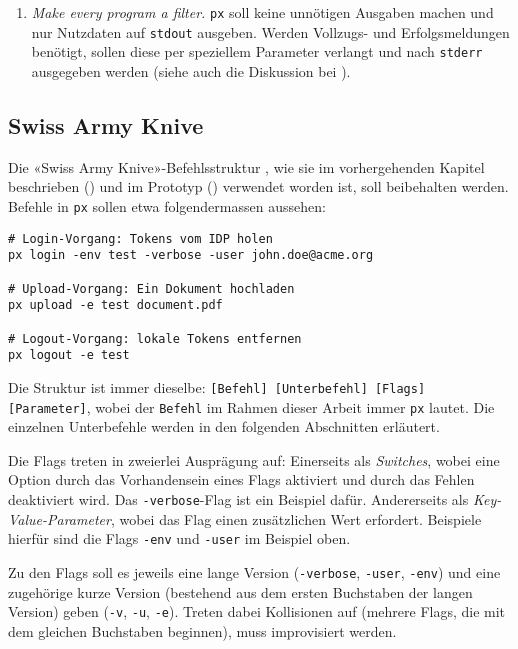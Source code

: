 \begin{enumerate}
    \item \textit{Make every program a filter.} \texttt{px} soll keine unnötigen Ausgaben machen und nur Nutzdaten auf \texttt{stdout} ausgeben. Werden Vollzugs- und Erfolgsmeldungen benötigt, sollen diese per speziellem Parameter verlangt und nach \texttt{stderr} ausgegeben werden (siehe auch die Diskussion bei ).
\end{enumerate}

\subsection{Swiss Army Knive}
\label{sec:Swiss-Army-Knive}

Die «Swiss Army Knive»-Befehlsstruktur \cite[S. 290]{gopl}, wie sie im vorhergehenden Kapitel beschrieben () und im Prototyp () verwendet worden ist, soll beibehalten werden. Befehle in \texttt{px} sollen etwa folgendermassen aussehen:

\begin{lstlisting}[caption={Beispielhafter Befehl mit Command, Subcommand, Flags, Parametern}]
# Login-Vorgang: Tokens vom IDP holen
px login -env test -verbose -user john.doe@acme.org

# Upload-Vorgang: Ein Dokument hochladen
px upload -e test document.pdf

# Logout-Vorgang: lokale Tokens entfernen
px logout -e test
\end{lstlisting}

Die Struktur ist immer dieselbe: \texttt{[Befehl] [Unterbefehl] [Flags] [Parameter]}, wobei der \texttt{Befehl} im Rahmen dieser Arbeit immer \texttt{px} lautet. Die einzelnen Unterbefehle werden in den folgenden Abschnitten erläutert.

Die Flags treten in zweierlei Ausprägung auf: Einerseits als \textit{Switches}, wobei eine Option durch das Vorhandensein eines Flags aktiviert und durch das Fehlen deaktiviert wird. Das \texttt{-verbose}-Flag ist ein Beispiel dafür. Andererseits als \textit{Key-Value-Parameter}, wobei das Flag einen zusätzlichen Wert erfordert. Beispiele hierfür sind die Flags \texttt{-env} und \texttt{-user} im Beispiel oben.

Zu den Flags soll es jeweils eine lange Version (\texttt{-verbose}, \texttt{-user}, \texttt{-env}) und eine zugehörige kurze Version (bestehend aus dem ersten Buchstaben der langen Version) geben (\texttt{-v}, \texttt{-u}, \texttt{-e}). Treten dabei Kollisionen auf (mehrere Flags, die mit dem gleichen Buchstaben beginnen), muss improvisiert werden.

